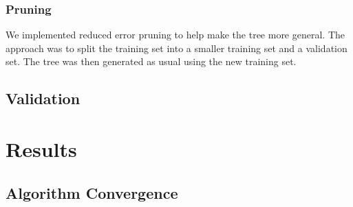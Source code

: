 \documentclass{article}
\begin{document}
	\subsubsection{Pruning}
	We implemented reduced error pruning to help make the tree more general. The approach was to split the training set into a smaller training set and a validation set. The tree was then generated as usual using the new training set. 
	\subsection{Validation}
\section{Results}
	\subsection{Algorithm Convergence}
		\label{conv}
\end{document}
